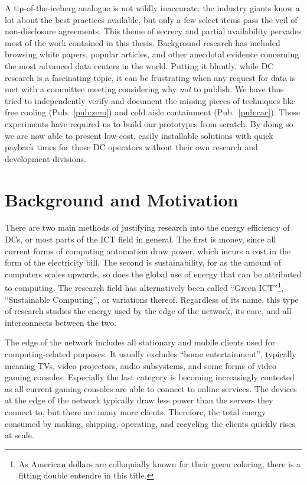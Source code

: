 \documentclass[officiallayout]{tktla}
\begin{document}
A tip-of-the-iceberg analogue is not wildly inaccurate: the industry giants
know a lot about the best practices available, but only a few select items
pass the veil of non-disclosure agreements. This theme of secrecy and partial
availability pervades most of the work contained in this thesis. Background
research has included browsing white papers, popular articles, and other
anecdotal evidence concerning the most advanced data centers in the world.
Putting it bluntly, while DC research is a fascinating topic, it can be
frustrating when any request for data is met with a committee meeting
considering why \emph{not} to publish. We have thus tried to independently
verify and document the missing pieces of techniques like free cooling
(Pub.~\ref{pub:zero}) and cold aisle containment (Pub.~\ref{pub:cac}). These
experiments have required us to build our prototypes from scratch. By doing so
we are now able to present low-cost, easily installable solutions with quick
payback times for those DC operators without their own research and
development divisions.


\section{Background and Motivation}
\label{sec:motivation}

There are two main methods of justifying research into the energy efficiency
of DCs, or most parts of the ICT field in general. The first is money, since
all current forms of computing automation draw power, which incurs a cost in
the form of the electricity bill. The second is sustainability, for as the
amount of computers scales upwards, so does the global use of energy that can
be attributed to computing. The research field has alternatively been called
``Green ICT''\footnote{As American dollars are colloquially known for their
green coloring, there is a fitting double entendre in this title.},
``Sustainable Computing'', or variations thereof. Regardless of its name, this
type of research studies the energy used by the edge of the network, its core,
and all interconnects between the two.

The edge of the network includes all stationary and mobile clients used for
computing-related purposes. It usually excludes ``home entertainment'',
typically meaning TVs, video projectors, audio subsystems, and some forms of
video gaming consoles. Especially the last category is becoming increasingly
contested as all current gaming consoles are able to connect to online
services. The devices at the edge of the network typically draw less power
than the servers they connect to, but there are many more clients. Therefore,
the total energy consumed by making, shipping, operating, and recycling the
clients quickly rises at scale.
\end{document}
